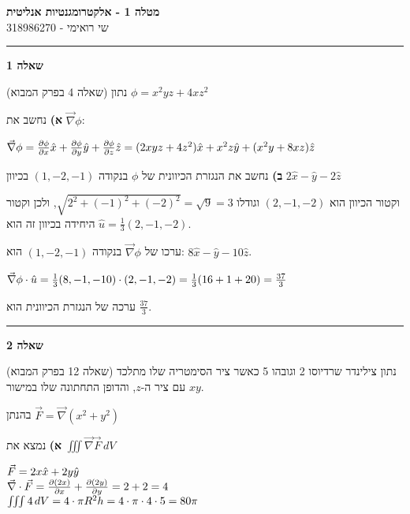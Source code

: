 \documentclass[14pt]{extarticle}
\makeatletter
\newenvironment{lefteqs}{%
    \begin{english}%
    \begin{flushleft}%
    \renewcommand{\arraystretch}{1.3}%
    $\begin{array}{@{}l@{}}%
}{%
    \end{array}$%
    \end{flushleft}%
    \end{english}%
}
\makeatother
\begin{document}
\begin{center}
    {\LARGE \textbf{מטלה 1 - אלקטרומגנטיות אנליטית}}\\[0.5em]
    {\large שי רואימי - 318986270}\\[0.3em]
\end{center}

\hrule
\vspace{2em}

\textbf{\large שאלה 1}

(שאלה 4 בפרק המבוא)
נתון $\phi=x^2yz+4xz^2$

\textbf{א)}
נחשב את $\vec{\nabla} \phi$:

\begin{lefteqs}
    \vec{\nabla} \phi = \frac{\partial \phi}{\partial x} \hat{x} + \frac{\partial \phi}{\partial y} \hat{y} + \frac{\partial \phi}{\partial z} \hat{z}
    = (2xyz+4z^2)\hat{x} + x^2z\hat{y} + (x^2y+8xz)\hat{z}
\end{lefteqs}

\textbf{ב)}
נחשב את הנגזרת הכיוונית של $\phi$ בנקודה $(1,-2,-1)$ בכיוון $2\hat{x}-\hat{y}-2\hat{z}$

וקטור הכיוון הוא $(2,-1,-2)$ וגודלו $\sqrt{2^2+(-1)^2+(-2)^2}=\sqrt{9}=3$,
ולכן וקטור היחידה בכיוון זה הוא $\hat{u}=\frac{1}{3}(2,-1,-2)$.

ערכו של $\vec{\nabla} \phi$ בנקודה $(1,-2,-1)$ הוא: $8\hat{x} - \hat{y} -10\hat{z}$.

\begin{lefteqs}
    \vec{\nabla} \phi \cdot \hat{u} = \frac{1}{3} (8,-1,-10) \cdot (2,-1,-2) = \frac{1}{3} (16 + 1 +20) = \frac{37}{3}
\end{lefteqs}
ערכה של הנגזרת הכיוונית הוא $\frac{37}{3}$.

\vspace{3em}
\hrule
\vspace{2em}

\textbf{\large שאלה 2}

(שאלה 12 בפרק המבוא)
נתון צילינדר שרדיוסו 2 וגובהו 5 כאשר ציר הסימטריה שלו מתלכד עם ציר ה-$z$, והדופן התחתונה שלו במישור $xy$.

בהנתן $\vec{F}=\vec{\nabla} (x^2+y^2)$

\textbf{א)}
נמצא את $\iiint \vec{\nabla} \vec{F} \, dV$

\begin{lefteqs}
    \vec{F} = 2x \hat{x} + 2y \hat{y} \\
    \vec{\nabla} \cdot \vec{F} = \frac{\partial (2x)}{\partial x} + \frac{\partial (2y)}{\partial y} = 2 + 2 = 4 \\
    \iiint 4 \, dV = 4 \cdot \pi R^2 h = 4 \cdot \pi \cdot 4 \cdot 5 = 80 \pi
\end{lefteqs}
\end{document}
